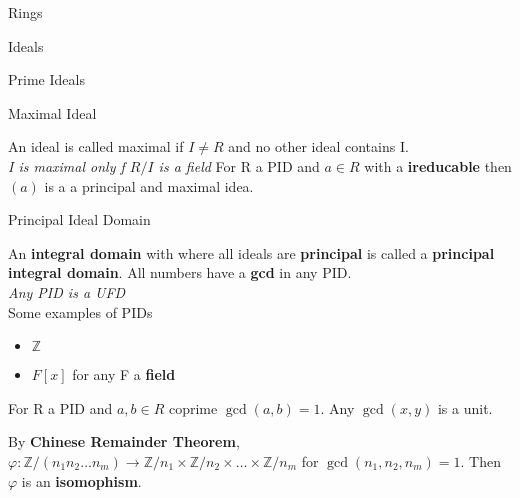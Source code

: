 \documentclass[12pt, letterpaper]{article}
\begin{document}
\begin{section}{Rings}
\begin{subsection}{Ideals}
\begin{subsubsection}{Prime Ideals}
    \end{subsubsection}

    \begin{subsubsection}{Maximal Ideal}

      An ideal is called maximal if \(I \neq R\) and no other ideal contains I. \\
      \emph{I is maximal only f \(R/I\) is a field} For R a PID and \(a \in R\)
      with a \textbf{ireducable} then \((a)\) is a a principal and maximal idea.


    \end{subsubsection}

  \end{subsection}

  \begin{subsection}{Principal Ideal Domain}

    An \textbf{integral domain} with where all ideals are \textbf{principal}
    is called a \textbf{principal integral domain}. All numbers have a \textbf{gcd}
    in any PID.\\
    \emph{Any PID is a UFD} \\

    Some examples of PIDs
    \begin{itemize}
      \item \(\mathbb{Z}\)
      \item \(F[x]\) for any F a \textbf{field}
    \end{itemize}

    For R a PID and \(a, b \in R\) coprime \(\gcd(a, b) = 1\). Any
    \(\gcd(x, y)\) is a unit.

    By \textbf{Chinese Remainder Theorem},
    \(\varphi: \mathbb{Z}/(n_{1}n_{2} \dots n_{m}) \to \mathbb{Z}/n_{1} \times
    \mathbb{Z}/n_{2} \times \dots \times \mathbb{Z}/n_{m}\) for
    \(\gcd(n_{1}, n_{2}, n_{m}) = 1\). Then \(\varphi\) is an \textbf{isomophism}.


  \end{subsection}

\end{section}
\end{document}
